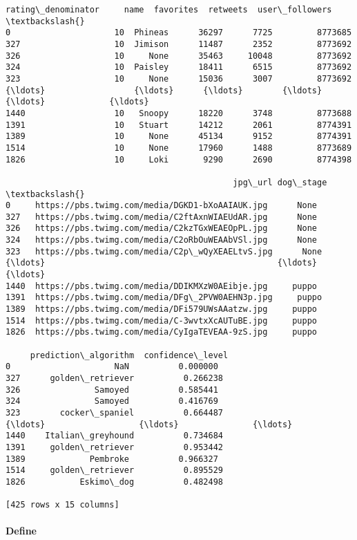 \documentclass[11pt]{article}
\begin{document}
\begin{tcolorbox}[breakable, size=fbox, boxrule=.5pt, pad at break*=1mm, opacityfill=0]
\begin{Verbatim}[commandchars=\\\{\}]
      rating\_denominator     name  favorites  retweets  user\_followers  \textbackslash{}
0                     10  Phineas      36297      7725         8773685
327                   10  Jimison      11487      2352         8773692
326                   10     None      35463     10048         8773692
324                   10  Paisley      18411      6515         8773692
323                   10     None      15036      3007         8773692
{\ldots}                  {\ldots}      {\ldots}        {\ldots}       {\ldots}             {\ldots}
1440                  10   Snoopy      18220      3748         8773688
1391                  10   Stuart      14212      2061         8774391
1389                  10     None      45134      9152         8774391
1514                  10     None      17960      1488         8773689
1826                  10     Loki       9290      2690         8774398

                                              jpg\_url dog\_stage  \textbackslash{}
0     https://pbs.twimg.com/media/DGKD1-bXoAAIAUK.jpg      None
327   https://pbs.twimg.com/media/C2ftAxnWIAEUdAR.jpg      None
326   https://pbs.twimg.com/media/C2kzTGxWEAEOpPL.jpg      None
324   https://pbs.twimg.com/media/C2oRbOuWEAAbVSl.jpg      None
323   https://pbs.twimg.com/media/C2p\_wQyXEAELtvS.jpg      None
{\ldots}                                               {\ldots}       {\ldots}
1440  https://pbs.twimg.com/media/DDIKMXzW0AEibje.jpg     puppo
1391  https://pbs.twimg.com/media/DFg\_2PVW0AEHN3p.jpg     puppo
1389  https://pbs.twimg.com/media/DFi579UWsAAatzw.jpg     puppo
1514  https://pbs.twimg.com/media/C-3wvtxXcAUTuBE.jpg     puppo
1826  https://pbs.twimg.com/media/CyIgaTEVEAA-9zS.jpg     puppo

     prediction\_algorithm  confidence\_level
0                     NaN          0.000000
327      golden\_retriever          0.266238
326               Samoyed          0.585441
324               Samoyed          0.416769
323        cocker\_spaniel          0.664487
{\ldots}                   {\ldots}               {\ldots}
1440    Italian\_greyhound          0.734684
1391     golden\_retriever          0.953442
1389             Pembroke          0.966327
1514     golden\_retriever          0.895529
1826           Eskimo\_dog          0.482498

[425 rows x 15 columns]
\end{Verbatim}
\end{tcolorbox}
        
    \hypertarget{define}{%
\paragraph{Define}\label{define}}
\end{document}
